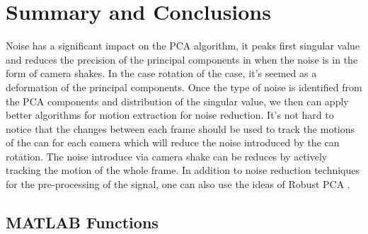 \documentclass{article}
\begin{document}
\section{Summary and Conclusions}
    \hspace{1.1em}
    Noise has a significant impact on the PCA algorithm, it peaks first singular value and reduces the precision of the principal components in when the noise is in the form of camera shakes. In the case rotation of the case, it's seemed as a deformation of the principal components. Once the type of noise is identified from the PCA components and distribution of the singular value, we then can apply better algorithms for motion extraction for noise reduction. It's not hard to notice that the changes between each frame should be used to track the motions of the can for each camera which will reduce the noise introduced by the can rotation. The noise introduce via camera shake can be reduces by actively tracking the motion of the whole frame. In addition to noise reduction techniques for the pre-processing of the signal, one can also use the ideas of Robust PCA \cite{kutz_2013_pg403}. 

\begin{appendices}

\section{MATLAB Functions}

    
\end{appendices}
\end{document}
